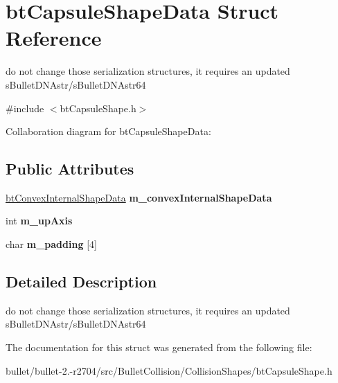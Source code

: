 \hypertarget{structbt_capsule_shape_data}{\section{bt\+Capsule\+Shape\+Data Struct Reference}
\label{structbt_capsule_shape_data}
}


do not change those serialization structures, it requires an updated s\+Bullet\+D\+N\+Astr/s\+Bullet\+D\+N\+Astr64  




{\ttfamily \#include $<$bt\+Capsule\+Shape.\+h$>$}



Collaboration diagram for bt\+Capsule\+Shape\+Data\+:
\subsection*{Public Attributes}
\begin{DoxyCompactItemize}
\item 
\hypertarget{structbt_capsule_shape_data_a86a0d8a17ef2d9910e1c755845a5f353}{\hyperlink{structbt_convex_internal_shape_data}{bt\+Convex\+Internal\+Shape\+Data} {\bfseries m\+\_\+convex\+Internal\+Shape\+Data}}\label{structbt_capsule_shape_data_a86a0d8a17ef2d9910e1c755845a5f353}

\item 
\hypertarget{structbt_capsule_shape_data_a49e41ca440c0504025e9b1d546faaea2}{int {\bfseries m\+\_\+up\+Axis}}\label{structbt_capsule_shape_data_a49e41ca440c0504025e9b1d546faaea2}

\item 
\hypertarget{structbt_capsule_shape_data_a1754e397b13fdce5492f4d486e139263}{char {\bfseries m\+\_\+padding} \mbox{[}4\mbox{]}}\label{structbt_capsule_shape_data_a1754e397b13fdce5492f4d486e139263}

\end{DoxyCompactItemize}


\subsection{Detailed Description}
do not change those serialization structures, it requires an updated s\+Bullet\+D\+N\+Astr/s\+Bullet\+D\+N\+Astr64 

The documentation for this struct was generated from the following file\+:\begin{DoxyCompactItemize}
\item 
bullet/bullet-\/2.-\/r2704/src/\+Bullet\+Collision/\+Collision\+Shapes/bt\+Capsule\+Shape.\+h\end{DoxyCompactItemize}

